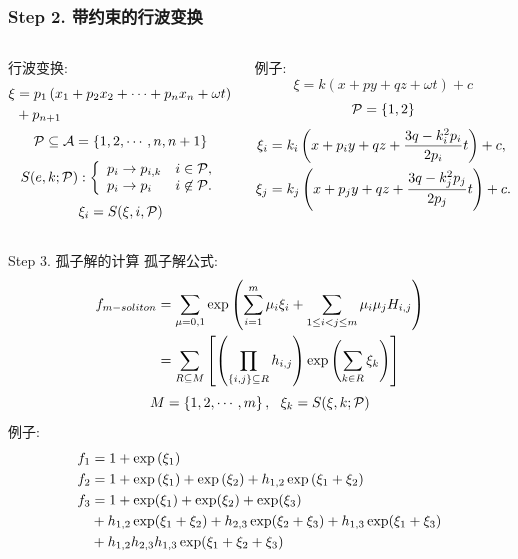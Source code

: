 \begin{frame}
\frametitle{Step 2. 带约束的行波变换}
\begin{columns}
\footnotesize 
\begin{column}{0.5\textwidth}
行波变换:
\[
\begin{aligned}
    \xi&=p_1\left(x_1+p_2x_2+\cdots+p_nx_n+\omega t\right) \\ 
    &+p_{n+1}
\end{aligned}
\]
\[
    \mathcal{P}\subseteq  \mathcal{A}=\left\{1,2,\cdots,n,n+1\right\}
\]
\[
    S(e,k;\mathcal{P}): \left\{\begin{array}{ll}
        p_i \rightarrow p_{i,k} & i \in \mathcal{P}, \\ 
        p_i \rightarrow p_i & i \not\in \mathcal{P}.
    \end{array}\right.
\]
\[
    \xi_i=S(\xi,i,\mathcal{P})
\]
\end{column}
\begin{column}{0.5\textwidth}
例子:
\[
    \xi=k(x+py+qz+\omega t)+c
\]
\[
    \mathcal{P}=\left\{1,2\right\}
\]
\[
\begin{aligned}
    \xi_i&=k_i\left(x+p_iy+qz+\frac{3q-k_i^2p_i}{2p_i}t\right)+c, \\ 
    \xi_j&=k_j\left(x+p_jy+qz+\frac{3q-k_j^2p_j}{2p_j}t\right)+c.
\end{aligned} 
\]
\end{column}
\end{columns}
\end{frame}

\begin{frame}{Step 3. 孤子解的计算}
\small 
孤子解公式:
\[
\begin{aligned}
    f_{m-soliton}&=\sum_{\mu=0,1}\exp\left(\sum_{i=1}^m{\mu_i \xi_i}+\sum_{1\le i<j\le m}{\mu_i\mu_jH_{i,j}}\right) \\ 
    &=\sum_{R\subseteq M}\left[\left(\prod_{\left\{i,j\right\}\subseteq R}{h_{i,j}}\right)\exp\left(\sum_{k\in R}{\xi_k}\right)\right] \\ 
\end{aligned}
\]
\[
    M=\left\{1,2,\cdots,m\right\},~~\xi_k=S(\xi,k;\mathcal{P})
\]
例子:
\[
\begin{aligned}
    f_1&=1+\exp\left(\xi_1\right) \\ 
    f_2&=1+\exp\left(\xi_1\right)+\exp\left(\xi_2\right)+h_{1,2}\exp\left(\xi_1+\xi_2\right) \\ 
    f_3&=1+\exp(\xi_1)+\exp(\xi_2)+\exp(\xi_3)\\
       &+h_{1,2}\exp(\xi_1+\xi_2)+h_{2,3}\exp(\xi_2+\xi_3)+h_{1,3}\exp(\xi_1+\xi_3)\\
       &+h_{1,2}h_{2,3}h_{1,3}\exp(\xi_1+\xi_2+\xi_3)
\end{aligned}
\]
\end{frame}

